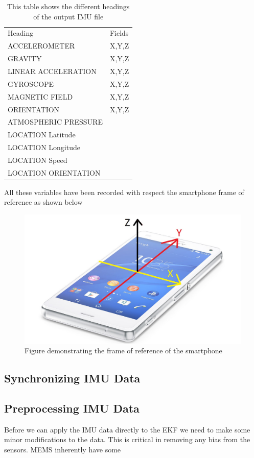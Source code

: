 \begin{table}
\centering
\caption{This table shows the different headings of the output IMU file}
\label{IMU Headings}
\begin{tabular}{ll}
Heading               & Fields  \\
ACCELEROMETER       & X,Y,Z  \\
GRAVITY              & X,Y,Z \\
LINEAR ACCELERATION  & X,Y,Z\\
GYROSCOPE            & X,Y,Z \\
MAGNETIC FIELD       &  X,Y,Z\\
ORIENTATION          &  X,Y,Z\\
ATMOSPHERIC PRESSURE  &  \\
LOCATION Latitude     &  \\
LOCATION Longitude    &  \\
LOCATION Speed        &  \\
LOCATION ORIENTATION  & 
\end{tabular}
\end{table}

All these variables have been recorded with respect the smartphone frame of reference as shown below
\begin{figure}[!ht] 
\captionsetup{width=0.5\linewidth, font=small}  
\includegraphics[width=0.5\linewidth]{figures/phone.jpg}
\caption{Figure demonstrating the frame of reference of the smartphone}
\label{fig:phone}
\end{figure}

\subsection{Synchronizing IMU Data}

\subsection{Preprocessing IMU Data}
Before we can apply the IMU data directly to the EKF we need to make some minor modifications to the data. This is critical in removing any bias from the sensors. MEMS inherently have some 

